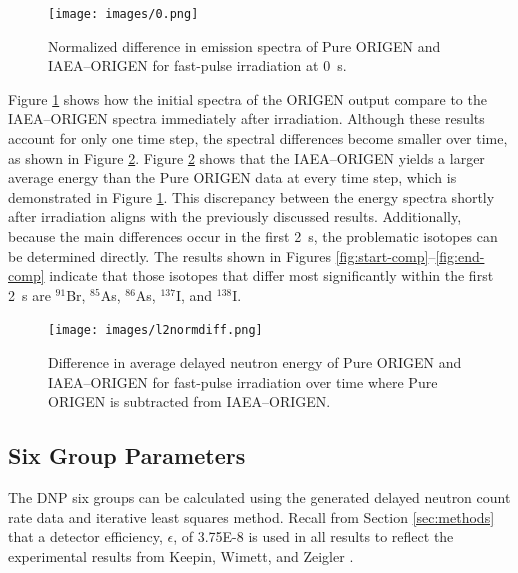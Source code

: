 \documentclass{style/nseJournal}
\begin{document}
\begin{figure}[]
\centering
\texttt{[image: images/0.png]}
\caption{Normalized difference in emission spectra of Pure ORIGEN and IAEA--ORIGEN for  fast-pulse irradiation at 0~s.}
\label{fig:net-spec}
\end{figure}

Figure \ref{fig:net-spec} shows how the initial spectra of the ORIGEN output compare to the IAEA--ORIGEN spectra immediately after irradiation.
Although these results account for only one time step, the spectral differences become smaller over time, as shown in Figure \ref{fig:spec-diff}.
Figure \ref{fig:spec-diff} shows that the IAEA--ORIGEN yields a larger average energy than the Pure ORIGEN data at every time step, which is demonstrated in Figure \ref{fig:net-spec}.
This discrepancy between the energy spectra shortly after irradiation aligns with the previously discussed results.
Additionally, because the main differences occur in the first 2~s, the problematic isotopes can be determined directly. The results shown in Figures \ref{fig:start-comp}--\ref{fig:end-comp} indicate that those isotopes that differ most significantly within the first 2~s are $^{91}$Br, $^{85}$As, $^{86}$As, $^{137}$I, and $^{138}$I.

\begin{figure}[]
\centering
\texttt{[image: images/l2normdiff.png]}
\caption{Difference in average delayed neutron energy of Pure ORIGEN and IAEA--ORIGEN for  fast-pulse irradiation over time where Pure ORIGEN is subtracted from IAEA--ORIGEN.}
\label{fig:spec-diff}
\end{figure}
\subsection{Six Group Parameters}
\label{sec:sixgroupfit}

The DNP six groups can be calculated using the generated delayed neutron count rate data and iterative least squares method.
Recall from Section \ref{sec:methods} that a detector efficiency, $\epsilon$, of 3.75E-8 is used in all results to reflect the experimental results from Keepin, Wimett, and Zeigler \cite{KEEPIN1957IN2}.
\end{document}
